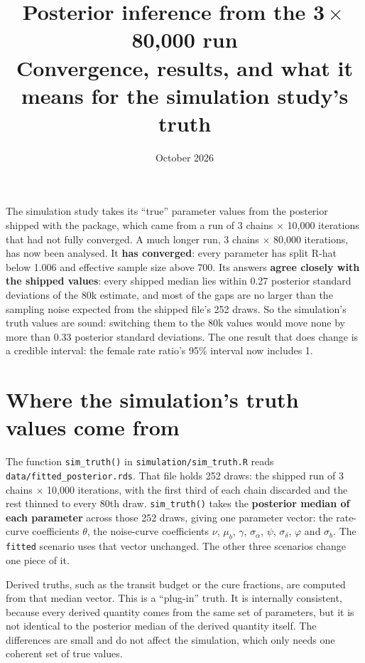 \documentclass[11pt]{article}
\title{\textbf{Posterior inference from the 3\,$\times$\,80,000 run}\\[4pt]
\large Convergence, results, and what it means for the simulation study's truth}
\date{October 2026}
\author{}
\newcommand{\code}[1]{\texttt{\small #1}}
\begin{document}
\maketitle
\vspace{-2.2em}

\begin{plain}[Summary]
The simulation study takes its ``true'' parameter values from the posterior shipped with the package, which came from a run of 3 chains $\times$ 10,000 iterations that had not fully converged. A much longer run, 3 chains $\times$ 80,000 iterations, has now been analysed. It \textbf{has converged}: every parameter has split R-hat below 1.006 and effective sample size above 700. Its answers \textbf{agree closely with the shipped values}: every shipped median lies within 0.27 posterior standard deviations of the 80k estimate, and most of the gaps are no larger than the sampling noise expected from the shipped file's 252 draws. So the simulation's truth values are sound: switching them to the 80k values would move none by more than 0.33 posterior standard deviations. The one result that does change is a credible interval: the female rate ratio's 95\% interval now includes 1.
\end{plain}

\section{Where the simulation's truth values come from}

The function \code{sim\_truth()} in \code{simulation/sim\_truth.R} reads \code{data/fitted\_posterior.rds}. That file holds 252 draws: the shipped run of 3 chains $\times$ 10,000 iterations, with the first third of each chain discarded and the rest thinned to every 80th draw. \code{sim\_truth()} takes the \textbf{posterior median of each parameter} across those 252 draws, giving one parameter vector: the rate-curve coefficients $\theta$, the noise-curve coefficients $\nu$, $\mu_b$, $\gamma$, $\sigma_\alpha$, $\psi$, $\sigma_\delta$, $\varphi$ and $\sigma_b$. The \code{fitted} scenario uses that vector unchanged. The other three scenarios change one piece of it.

Derived truths, such as the transit budget or the cure fractions, are computed from that median vector. This is a ``plug-in'' truth. It is internally consistent, because every derived quantity comes from the same set of parameters, but it is not identical to the posterior median of the derived quantity itself. The differences are small and do not affect the simulation, which only needs one coherent set of true values.
\end{document}
